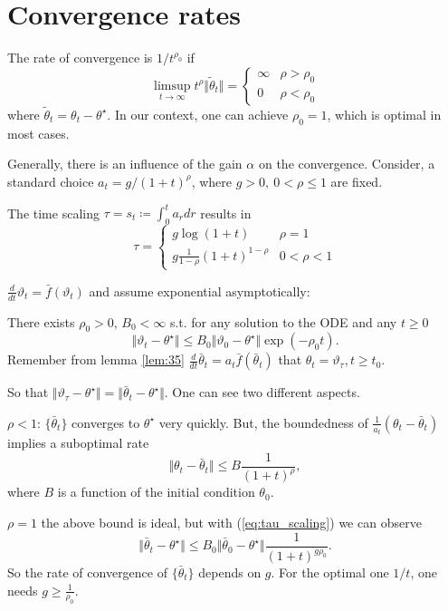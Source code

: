 \section{Convergence rates}

The rate of convergence is \(1/t^{\rho_0}\) if 
\[\limsup_{t\to\infty} t^\rho\Vert \tilde{\theta}_t\Vert = \begin{cases}
    \infty  & \rho>\rho_0\\ 
    0 & \rho<\rho_0
\end{cases}\]
where \(\tilde{\theta}_t=\theta_t-\theta^\star\). In our context, one can achieve \(\rho_0=1\),
which is optimal in most cases.

Generally, there is an influence of the gain \(\alpha\) on the convergence. Consider, a standard 
choice \(a_t=g/(1+t)^\rho\), where \(g>0,\ 0< \rho\leq 1\) are fixed.

The time scaling \(\tau=s_t\coloneqq \int_0^t a_rdr\) results in 
\begin{equation}\label{eq:tau_scaling}\tau=\begin{cases}
    g\log(1+t) & \rho=1\\
    g\frac{1}{1-\rho}(1+t)^{1-\rho} & 0<\rho < 1
\end{cases}\end{equation} 

\(\frac{d}{dt}\vartheta_t=\bar{f}(\vartheta_t)\) and assume exponential asymptotically: 

There exists \(\rho_0>0\), \(B_0<\infty\) s.t. for any solution to the ODE and any \(t\geq 0\)
\[\Vert \vartheta_t-\theta^\star\Vert\leq B_0\Vert \vartheta_0-\theta^\star\Vert \exp(-\rho_0t).\]
Remember from  lemma \ref{lem:35} \(\frac{d}{dt}\bar{\theta}_t=a_t\bar{f}(\bar{\theta}_t)\) that 
\(\theta_t=\vartheta_\tau,t\geq t_0\).

So that \(\Vert \vartheta_\tau-\theta^\star\Vert=\Vert \bar{\theta}_t-\theta^\star\Vert\). One can 
see two different aspects.

\(\rho<1\): \(\{\bar{\theta}_t\}\) converges to \(\theta^\star\) very quickly. But, 
the boundedness of \(\frac{1}{a_t}(\theta_t-\bar{\theta}_t)\) implies a suboptimal rate 
\[\Vert \theta_t-\bar{\theta}_t\Vert\leq B\frac{1}{(1+t)^\rho},\]
where \(B\) is a function of the initial condition \(\theta_0\).

\(\rho=1\) the above bound is ideal, but with (\ref{eq:tau_scaling}) we can observe 
\[\Vert \bar{\theta}_t-\theta^\star\Vert \leq B_0\Vert \bar{\theta}_0-\theta^\star\Vert \frac{1}{(1+t)^{g\rho_0}}.\]
So the rate of convergence of \(\{\bar{\theta}_t\}\) depends on \(g\). For the optimal one \(1/t\), one needs 
\(g\geq \frac{1}{\rho_0}\).

